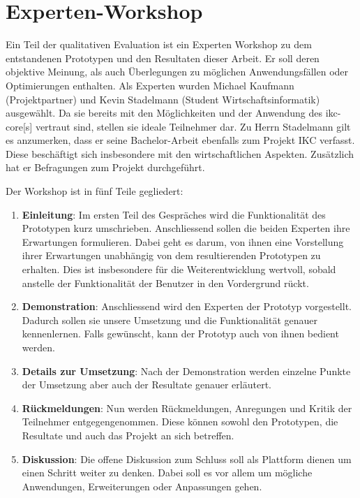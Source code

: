 \section{Experten-Workshop}

Ein Teil der qualitativen Evaluation ist ein Experten Workshop zu dem entstandenen Prototypen und den Resultaten dieser Arbeit. Er soll deren objektive Meinung, als auch Überlegungen zu möglichen Anwendungsfällen oder Optimierungen enthalten. Als Experten wurden Michael Kaufmann (Projektpartner) und Kevin Stadelmann (Student Wirtschaftsinformatik) ausgewählt. Da sie bereits mit den Mög\-lich\-keit\-en und der Anwendung des \gls{ikc-core}[s] vertraut sind, stellen sie ideale Teilnehmer dar. Zu Herrn Stadelmann gilt es anzumerken, dass er seine Bachelor-Arbeit ebenfalls zum Projekt \gls{IKC} verfasst. Diese beschäftigt sich insbesondere mit den wirtschaftlichen Aspekten. Zusätzlich hat er Befragungen zum Projekt durchgeführt.

Der Workshop ist in fünf Teile gegliedert:
\begin{enumerate}
    \item \textbf{Einleitung}: Im ersten Teil des Gespräches wird die Funktionalität des Prototypen kurz umschrieben. Anschliessend sollen die beiden Experten ihre Erwartungen formulieren. Dabei geht es darum, von ihnen eine Vorstellung ihrer Erwartungen unabhängig von dem resultierenden Prototypen zu erhalten. Dies ist insbesondere für die Weiterentwicklung wertvoll, sobald anstelle der Funktionalität der Benutzer in den Vordergrund rückt.
    \item \textbf{Demonstration}: Anschliessend wird den Experten der Prototyp vorgestellt. Dadurch sollen sie unsere Umsetzung und die Funktionalität genauer kennenlernen. Falls gewünscht, kann der Prototyp auch von ihnen bedient werden.
    \item \textbf{Details zur Umsetzung}: Nach der Demonstration werden einzelne Punkte der Umsetzung aber auch der Resultate genauer erläutert.
    \item \textbf{Rückmeldungen}: Nun werden Rückmeldungen, Anregungen und Kritik der Teilnehmer entgegengenommen. Diese können sowohl den Prototypen, die Resultate und auch das Projekt an sich betreffen.
    \item \textbf{Diskussion}: Die offene Diskussion zum Schluss soll als Plattform dienen um einen Schritt weiter zu denken. Dabei soll es vor allem um mögliche Anwendungen, Erweiterungen oder Anpassungen gehen.
\end{enumerate}


